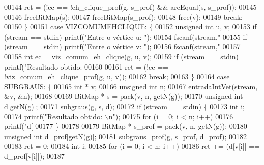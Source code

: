 \begin{DoxyCode}
{{{{{{00144                 ret = (!ec == !eh\_clique\_prof(g, s\_prof) && areEqual(s, s\_prof));
00145 
00146                 freeBitMap(s);
00147                 freeBitMap(s\_prof);
00148                 free(v);
00149                 \textcolor{keywordflow}{break};
00150         \}
00151         \textcolor{keywordflow}{case} VIZCOMUMEHCLIQUE: \{
00152                 \textcolor{keywordtype}{unsigned} \textcolor{keywordtype}{int} u, v;
00153                 \textcolor{keywordflow}{if} (stream == stdin) printf(\textcolor{stringliteral}{"Entre o vértice u: "});
00154                 fscanf(stream,\textcolor{stringliteral}{"%
00155                 \textcolor{keywordflow}{if} (stream == stdin) printf(\textcolor{stringliteral}{"Entre o vértice v: "});
00156                 fscanf(stream,\textcolor{stringliteral}{"%
00157 
00158                 \textcolor{keywordtype}{int} ec = viz_comum_eh_clique(g, u, v);
00159                 \textcolor{keywordflow}{if} (stream == stdin) printf(\textcolor{stringliteral}{"Resultado obtido: %
00160 
00161                 ret = (!ec == !viz\_comum\_eh\_clique\_prof(g, u, v));
00162                 \textcolor{keywordflow}{break};
00163         \}
00164         \textcolor{keywordflow}{case} SUBGRAUS: \{
00165                 \textcolor{keywordtype}{int} * v;
00166                 \textcolor{keywordtype}{unsigned} \textcolor{keywordtype}{int} n;
00167                 entradaIntVet(stream, &v, &n);
00168 
00169                 BitMap * s = pack(v, n, getN(g));
00170                 \textcolor{keywordtype}{unsigned} \textcolor{keywordtype}{int} d[getN(g)];
00171                 subgraus(g, s, d);
00172                 \textcolor{keywordflow}{if} (stream == stdin) \{
00173                         \textcolor{keywordtype}{int} i;
00174                         printf(\textcolor{stringliteral}{"Resultado obtido: \(\backslash\)n"});
00175                         \textcolor{keywordflow}{for} (i = 0; i < n; i++)
00176                                 printf(\textcolor{stringliteral}{"d[%
00177                 \}
00178 
00179                 BitMap * s\_prof = pack(v, n, getN(g));
00180                 \textcolor{keywordtype}{unsigned} \textcolor{keywordtype}{int} d\_prof[getN(g)];
00181                 subgraus\_prof(g, s\_prof, d\_prof);
00182 
00183                 ret = 0;
00184                 \textcolor{keywordtype}{int} i;
00185                 \textcolor{keywordflow}{for} (i = 0; i < n; i++)
00186                         ret += (d[v[i]] == d\_prof[v[i]]);
00187 
}}}}}}}}}}
\end{DoxyCode}
